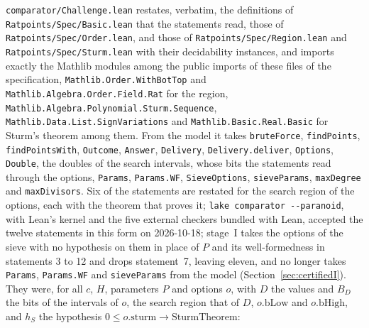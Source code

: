 \verb|comparator/Challenge.lean| restates, verbatim, the definitions of
\verb|Ratpoints/Spec/Basic.lean| that the statements read, those of
\verb|Ratpoints/Spec/Order.lean|, and those of \verb|Ratpoints/Spec/Region.lean| and
\verb|Ratpoints/Spec/Sturm.lean| with their decidability instances, and imports exactly the Mathlib
modules among the public imports of these files of the specification,
\verb|Mathlib.Order.WithBotTop| and \verb|Mathlib.Algebra.Order.Field.Rat| for the region,
\verb|Mathlib.Algebra.Polynomial.Sturm.Sequence|, \verb|Mathlib.Data.List.SignVariations| and
\verb|Mathlib.Basic.Real.Basic| for Sturm's theorem among them. From the model it takes
\verb|bruteForce|, \verb|findPoints|, \verb|findPointsWith|, \verb|Outcome|, \verb|Answer|,
\verb|Delivery|, \verb|Delivery.deliver|, \verb|Options|, \verb|Double|, the doubles of the search
intervals, whose bits the statements read through the options, \verb|Params|, \verb|Params.WF|,
\verb|SieveOptions|, \verb|sieveParams|, \verb|maxDegree| and \verb|maxDivisors|. Six of the
statements are restated for the search region of the options, each with the theorem that proves it;
\verb|lake comparator --paranoid|, with Lean's kernel and the five external checkers bundled
with Lean, accepted the twelve statements in this form on 2026-10-18; stage~I takes the options of
the sieve with no hypothesis on them in place of $P$ and its well-formedness in statements 3 to 12
and drops statement~7, leaving eleven, and no longer takes \verb|Params|, \verb|Params.WF| and
\verb|sieveParams| from the model (Section~\ref{sec:certifiedI}). They were, for all $c$, $H$,
parameters $P$ and options $o$, with $D$ the values and $B_D$ the bits of the intervals of $o$, the
search region that of $D$, $o.\mathrm{bLow}$ and $o.\mathrm{bHigh}$, and $h_S$ the hypothesis
$0 \le o.\mathrm{sturm} \to \mathrm{SturmTheorem}$:
